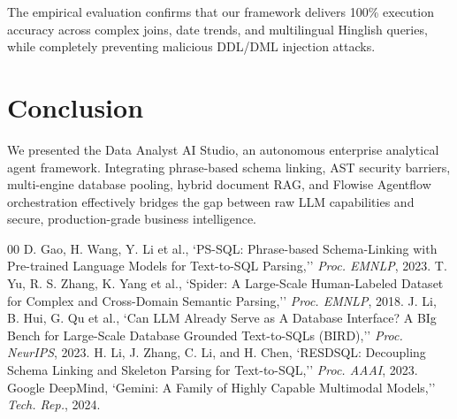 \documentclass[conference]{IEEEtran}
\begin{document}
The empirical evaluation confirms that our framework delivers 100\% execution accuracy across complex joins, date trends, and multilingual Hinglish queries, while completely preventing malicious DDL/DML injection attacks.

\section{Conclusion}
We presented the Data Analyst AI Studio, an autonomous enterprise analytical agent framework. Integrating phrase-based schema linking, AST security barriers, multi-engine database pooling, hybrid document RAG, and Flowise Agentflow orchestration effectively bridges the gap between raw LLM capabilities and secure, production-grade business intelligence.

\begin{thebibliography}{00}
 D. Gao, H. Wang, Y. Li et al., `PS-SQL: Phrase-based Schema-Linking with Pre-trained Language Models for Text-to-SQL Parsing,'' \emph{Proc. EMNLP}, 2023.
 T. Yu, R. S. Zhang, K. Yang et al., `Spider: A Large-Scale Human-Labeled Dataset for Complex and Cross-Domain Semantic Parsing,'' \emph{Proc. EMNLP}, 2018.
 J. Li, B. Hui, G. Qu et al., `Can LLM Already Serve as A Database Interface? A BIg Bench for Large-Scale Database Grounded Text-to-SQLs (BIRD),'' \emph{Proc. NeurIPS}, 2023.
 H. Li, J. Zhang, C. Li, and H. Chen, `RESDSQL: Decoupling Schema Linking and Skeleton Parsing for Text-to-SQL,'' \emph{Proc. AAAI}, 2023.
 Google DeepMind, `Gemini: A Family of Highly Capable Multimodal Models,'' \emph{Tech. Rep.}, 2024.
\end{thebibliography}
\end{document}

